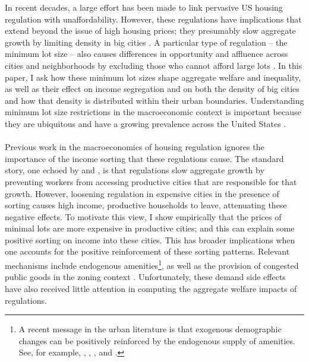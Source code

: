 \documentclass[]{article}
\begin{document}
	In recent decades, a large effort has been made to link pervasive US housing regulation with unaffordability. However, these regulations have implications that extend beyond the issue of high housing prices; they presumably slow aggregate growth by limiting density in big cities \citep{hseihmoretti,durantonpugaurbgrowth}. A particular type of regulation -- the minimum lot size -- also causes differences in opportunity and affluence across cities and neighborhoods by excluding those who cannot afford large lots \citep{Song, kulka}. In this paper, I ask how these minimum lot sizes shape aggregate welfare and inequality, as well as their effect on income segregation and on both the density of big cities and how that density is distributed within their urban boundaries. Understanding minimum lot size restrictions in the macroeconomic context is important because they are ubiquitous and have a growing prevalence across the United States \citep{gyourko2021}. 
	
	\paragraph*{}
	Previous work in the macroeconomics of housing regulation ignores the importance of the income sorting that these regulations cause. The standard story, one echoed by \cite{hseihmoretti} and \cite{durantonpugaurbgrowth}, is that regulations slow aggregate growth by preventing workers from accessing productive cities that are responsible for that growth. However, loosening regulation in expensive cities in the presence of sorting causes high income, productive households to leave, attenuating these negative effects. To motivate this view, I show empirically that the prices of minimal lots are more expensive in productive cities; and this can explain some positive sorting on income into these cities.  This has broader implications when one accounts for the positive reinforcement of these sorting patterns. Relevant mechanisms include endogenous amenities\footnote{A recent message in the urban literature is that exogenous demographic changes can be positively reinforced by the endogenous supply of amenities. See, for example,  \cite{Coutureetal}, \cite{AlmagroDI}, \cite{diamond2016}, and \cite{bshartley2020}.}, as well as the provision of congested public goods in the zoning context \citep{calabresetal, ineffTiebout}. Unfortunately, these demand side effects have also received little attention in computing the aggregate welfare impacts of regulations. 
	 
\end{document}
